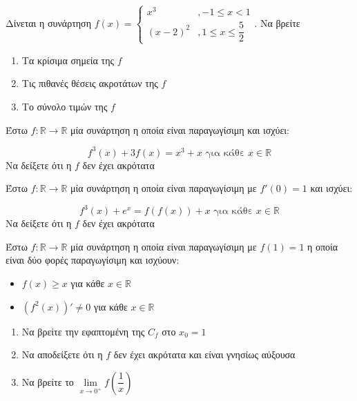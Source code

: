 \documentclass{presentation}
\begin{document}
\begin{askisi}
    Δίνεται η συνάρτηση $f(x)=\begin{cases}
            x^3     & ,-1\le x<1               \\
            (x-2)^2 & , 1\le x\le \dfrac{5}{2}
        \end{cases}$.
    Να βρείτε
    \begin{enumerate}
        \item<1-> Τα κρίσιμα σημεία της $f$
        \item<2-> Τις πιθανές θέσεις ακροτάτων της $f$
        \item<3-> Το σύνολο τιμών της $f$
    \end{enumerate}

\end{askisi}

\begin{askisi}
    Έστω $f:\mathbb{R}\to\mathbb{R}$ μία συνάρτηση η οποία είναι παραγωγίσιμη και ισχύει:

    $$f^3(x)+3f(x)=x^3+x \text{ για κάθε } x\in\mathbb{R}$$
    Να δείξετε ότι η $f$ δεν έχει ακρότατα

\end{askisi}

\begin{askisi}
    Έστω $f:\mathbb{R}\to\mathbb{R}$ μία συνάρτηση η οποία είναι παραγωγίσιμη με $f'(0)=1$ και ισχύει:

    $$f^3(x)+e^x=f(f(x))+x \text{ για κάθε } x\in\mathbb{R}$$
    Να δείξετε ότι η $f$ δεν έχει ακρότατα

\end{askisi}

\begin{askisi}
    Έστω $f:\mathbb{R}\to\mathbb{R}$ μία συνάρτηση η οποία είναι παραγωγίσιμη με $f(1)=1$ η οποία είναι δύο φορές παραγωγίσιμη και ισχύουν:
    \begin{itemize}
        \item $f(x)\ge x$ για κάθε $x\in\mathbb{R}$
        \item $\left( f^2(x) \right)'\ne 0$ για κάθε $x\in\mathbb{R}$
    \end{itemize}

    \begin{enumerate}
        \item<1-> Να βρείτε την εφαπτομένη της $C_f$ στο $x_0=1$
        \item<2-> Να αποδείξετε ότι η $f$ δεν έχει ακρότατα και είναι γνησίως αύξουσα
        \item<3-> Να βρείτε το $\lim\limits_{x \to 0^+}{ f\left( \dfrac{1}{x} \right) }$
    \end{enumerate}

\end{askisi}
\end{document}
